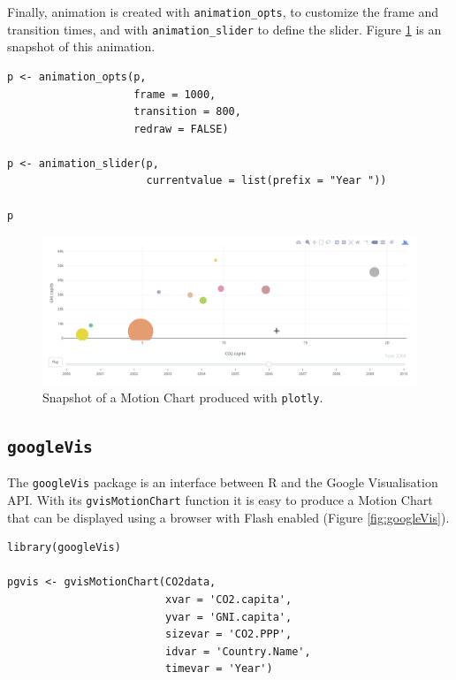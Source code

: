\documentclass[smallroyalvopaper]{memoir}
\begin{document}
Finally, animation is created with \texttt{animation\_opts}, to customize the
frame and transition times, and with \texttt{animation\_slider} to define the
slider. Figure \ref{fig:plotly_animation} is an snapshot of this
animation.

\lstset{language=r,label= ,caption= ,captionpos=b,numbers=none}
\begin{lstlisting}
p <- animation_opts(p,
                    frame = 1000,
                    transition = 800,
                    redraw = FALSE)

p <- animation_slider(p,
                      currentvalue = list(prefix = "Year "))

p
\end{lstlisting}

\begin{figure}[htbp]
\centering
\includegraphics[width=.9\linewidth]{figs/plotly_animation.png}
\caption{Snapshot of a Motion Chart produced with \texttt{plotly}. \label{fig:plotly_animation}}
\end{figure}

\subsection{\texttt{googleVis} \label{sec:googlevis}}
\label{sec:org0ac0b8e}
The \texttt{googleVis} package \cite{Gesmann.deCastillo2011} is an interface
between R and the Google Visualisation API. With its \texttt{gvisMotionChart}
function it is easy to produce a Motion Chart that can be displayed
using a browser with Flash enabled (Figure \ref{fig:googleVis}).

\lstset{language=r,label= ,caption= ,captionpos=b,numbers=none}
\begin{lstlisting}
library(googleVis)

pgvis <- gvisMotionChart(CO2data,
                         xvar = 'CO2.capita',
                         yvar = 'GNI.capita',
                         sizevar = 'CO2.PPP',
                         idvar = 'Country.Name',
                         timevar = 'Year')
\end{lstlisting}
\end{document}
